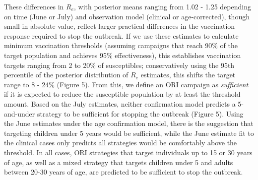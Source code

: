 These differences in $R_e$, with posterior means ranging from 1.02 - 1.25 depending on time (June or July) and observation model (clinical or age-corrected), though small in absolute value, reflect larger practical differences in the vaccination response required to stop the outbreak. If we use these estimates to calculate minimum vaccination thresholds (assuming campaigns that reach 90\% of the target population and achieves 95\% effectiveness), this establishes vaccination targets ranging from 2 to 20\% of susceptibles; conservatively using the 95th percentile of the posterior distribution of $R_e$ estimates, this shifts the target range to
8 - 24\% (Figure 5). From this, we define an ORI campaign as \emph{sufficient} if it is expected to reduce the susceptible population by at least the threshold amount. Based on the July estimates, neither confirmation model predicts a 5-and-under strategy to be sufficient for stopping the outbreak (Figure 5). Using the June estimates under the age confirmation model, there is the suggestion that targeting children under 5 years would be
sufficient, while the June estimate fit to the clinical cases only predicts all strategies would be comfortably above the threshold. In all cases, ORI strategies that target individuals up to 15 or 30 years of age, as well as a mixed strategy that targets children under 5 and adults between 20-30 years of age, are predicted to be sufficient to stop the outbreak.